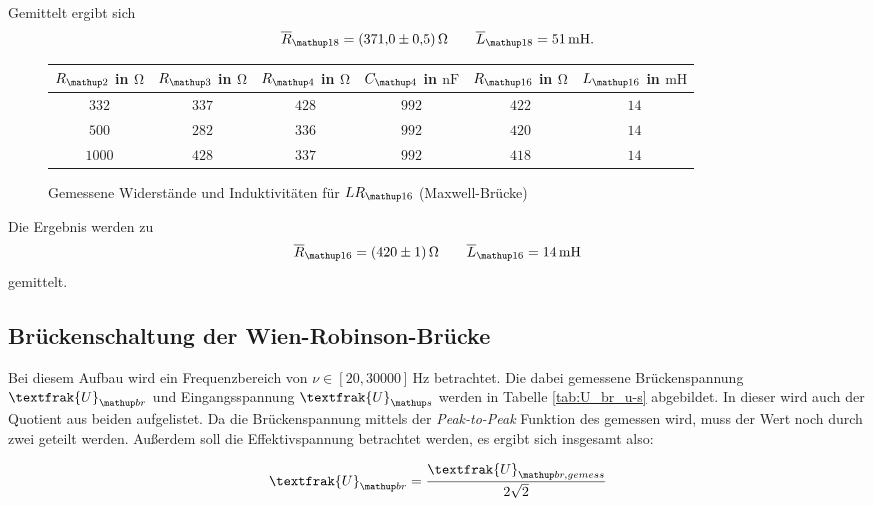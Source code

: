 Gemittelt ergibt sich
\begin{equation}
\label{eq:wert_lr_16_max}
\overline{R}_{\map{18}}=\SI{371\pm0.5}{\ohm} \qquad \overline{L}_{\map{18}}=\SI{51}{\milli\henry}.
\end{equation}


\begin{figure}
\centering
\caption{Gemessene Widerstände und Induktivitäten für $LR\ua{16}$ (Maxwell-Brücke)}
  \label{tab:lc_r16_max}
\begin{tabular}{S S S S S S }
    \toprule
    {$R\ua{2}$  in $\si{\ohm}$} &  {$R\ua{3}$ in $\si{\ohm}$} & {$R\ua{4}$ in $\si{\ohm}$} & {$C\ua{4}$ in $\si{\nano\farad}$}& {$R\ua{16}$ in $\si{\ohm}$} &  {$L\ua{16}$ in $\si{\milli\henry}$} \\
    \midrule
     {$\num{332}$} & {$\num{337}$} &  {$\num{428}$}& {$\num{992}$}  &  {$\num{422}$} & {$\num{14}$}\\
     {$\num{500}$} & {$\num{282}$}  & {$\num{336}$} & {$\num{992}$} & {$\num{420}$} & {$\num{14}$}\\
     {$\num{1000}$} & {$\num{428}$}  & {$\num{337}$} & {$\num{992}$} &{$\num{418}$} & {$\num{14}$}  \\
    \bottomrule
  \end{tabular}
 \end{figure}


Die Ergebnis werden zu 
\begin{equation}
\label{eq:wert_lr_16_max}
\overline{R}_{\map{16}}=\SI{420\pm1}{\ohm} \qquad \overline{L}_{\map{16}}=\SI{14}{\milli\henry}
\end{equation}
gemittelt.

\subsection{Brückenschaltung der Wien-Robinson-Brücke}

Bei diesem Aufbau wird ein Frequenzbereich von $\nu\in\left[20,30000\right]\,\si{\hertz}$ betrachtet.
Die dabei gemessene Brückenspannung $\textfrak{U}\ua{br}$ und Eingangsspannung $\textfrak{U}\ua{s}$ werden in Tabelle \ref{tab:U_br_u-s} abgebildet.
In dieser wird auch der Quotient aus beiden aufgelistet.
Da die Brückenspannung mittels der \emph{Peak-to-Peak} Funktion des gemessen wird, 
muss der Wert noch durch zwei geteilt werden. Außerdem soll die Effektivspannung betrachtet werden, es ergibt sich insgesamt also:


\begin{equation*}
\textfrak{U}\ua{br}=\frac{\textfrak{U}\ua{br,gemess}}{2\sqrt{2}}
\end{equation*}

